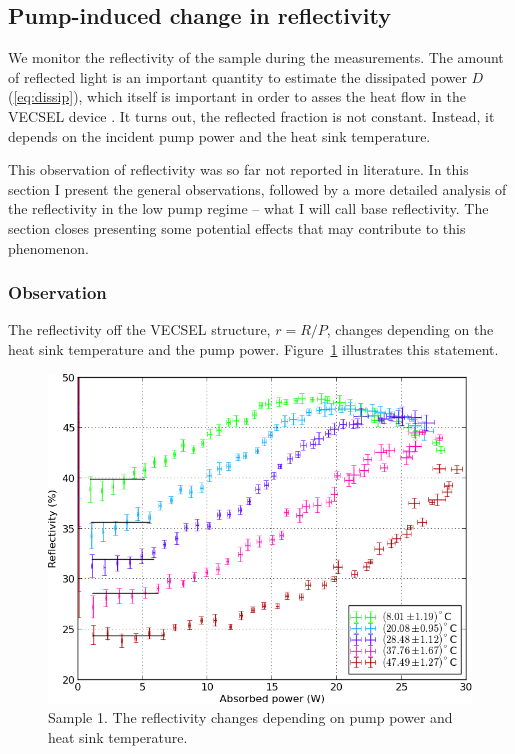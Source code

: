 \subsection{Pump-induced change in reflectivity}
\label{sec:eval:refl}

We monitor the reflectivity
of the sample during the measurements.
The amount of reflected light
is an important quantity
to estimate the dissipated power $D$ (\ref{eq:dissip}),
which itself is important
in order to asses the heat flow
in the VECSEL device \cite{Heinen2012}.
It turns out,
the reflected fraction
is not constant.
Instead,
it depends on
the incident pump power
and the heat sink temperature.

This observation of reflectivity
was so far not reported
in literature.
In this section
I present the general observations,
followed by a more detailed
analysis of the reflectivity
in the low pump regime --
what I will call base reflectivity.
The section closes
presenting some potential effects
that may contribute
to this phenomenon.

\subsubsection{Observation}

The reflectivity
off the VECSEL structure,
$r=R/P$,
changes depending on
the heat sink temperature
and the pump power.
Figure~\ref{img:basereflectivity}
illustrates this statement.

\begin{figure}
\centering
\includegraphics[width=14.5cm]{img/basereflectivity_temperatures.png}
\caption{Sample 1.
The reflectivity
changes depending on pump power
and heat sink temperature.}
\label{img:basereflectivity}
\end{figure}

